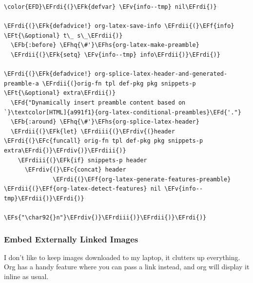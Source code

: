 \documentclass{scrartcl}
\newcommand{\EFk}[1]{\textcolor{EFk}{#1}} %
\newcommand{\EFd}[1]{\textcolor{EFd}{#1}} %
\newcommand{\EFt}[1]{\textcolor{EFt}{#1}} %
\newcommand{\EFs}[1]{\textcolor{EFs}{#1}} %
\newcommand{\EFb}[1]{\textcolor{EFb}{#1}} %
\newcommand{\EFc}[1]{\textcolor{EFc}{#1}} %
\newcommand{\EFv}[1]{\textcolor{EFv}{#1}} %
\newcommand{\EFf}[1]{\textcolor{EFf}{#1}} %
\newcommand{\EFhq}[1]{#1} %
\newcommand{\EFhs}[1]{#1} %
\newcommand{\EFrdi}[1]{#1} %
\newcommand{\EFrdii}[1]{#1} %
\newcommand{\EFrdiii}[1]{#1} %
\newcommand{\EFrdiv}[1]{#1} %
\begin{document}
\begin{Code}
\begin{Verbatim}[]
\color{EFD}\EFrdi{(}\EFk{defvar} \EFv{info--tmp} nil\EFrdi{)}

\EFrdi{(}\EFk{defadvice!} org-latex-save-info \EFrdii{(}\EFf{info} \EFt{\&optional} t\_ s\_\EFrdii{)}
  \EFb{:before} \EFhq{\#'}\EFhs{org-latex-make-preamble}
  \EFrdii{(}\EFk{setq} \EFv{info--tmp} info\EFrdii{)}\EFrdi{)}

\EFrdi{(}\EFk{defadvice!} org-splice-latex-header-and-generated-preamble-a \EFrdii{(}orig-fn tpl def-pkg pkg snippets-p \EFt{\&optional} extra\EFrdii{)}
  \EFd{"Dynamically insert preamble content based on `}\textcolor[HTML]{a991f1}{org-latex-conditional-preambles}\EFd{'."}
  \EFb{:around} \EFhq{\#'}\EFhs{org-splice-latex-header}
  \EFrdii{(}\EFk{let} \EFrdiii{(}\EFrdiv{(}header \EFrdi{(}\EFc{funcall} orig-fn tpl def-pkg pkg snippets-p extra\EFrdi{)}\EFrdiv{)}\EFrdiii{)}
    \EFrdiii{(}\EFk{if} snippets-p header
      \EFrdiv{(}\EFc{concat} header
              \EFrdi{(}\EFf{org-latex-generate-features-preamble} \EFrdii{(}\EFf{org-latex-detect-features} nil \EFv{info--tmp}\EFrdii{)}\EFrdi{)}
              \EFs{"\char92{}n"}\EFrdiv{)}\EFrdiii{)}\EFrdii{)}\EFrdi{)}
\end{Verbatim}
\end{Code}

\subsubsection{Embed Externally Linked Images}
\label{sec:orgf537a2a}
I don't like to keep images downloaded to my laptop, it clutters up everything.
Org has a handy feature where you can pass a link instead, and org will display
it inline as usual.
\end{document}
